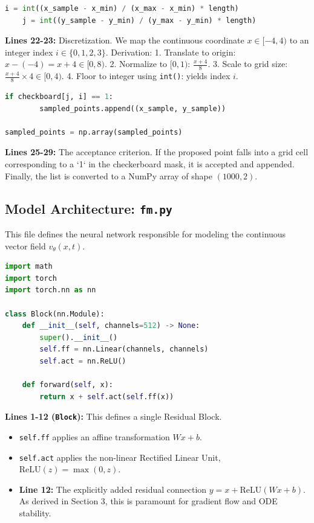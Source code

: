 \documentclass[12pt]{article}
\begin{document}
\begin{lstlisting}[language=Python]
    i = int((x_sample - x_min) / (x_max - x_min) * length)
    j = int((y_sample - y_min) / (y_max - y_min) * length)
\end{lstlisting}
\textbf{Lines 22-23:} Discretization. We map the continuous coordinate $x \in [-4, 4)$ to an integer index $i \in \{0, 1, 2, 3\}$.
Derivation: 
1. Translate to origin: $x - (-4) = x + 4 \in [0, 8)$.
2. Normalize to $[0, 1)$: $\frac{x+4}{8}$.
3. Scale to grid size: $\frac{x+4}{8} \times 4 \in [0, 4)$.
4. Floor to integer using \texttt{int()}: yields index $i$.

\begin{lstlisting}[language=Python]
    if checkboard[j, i] == 1:
        sampled_points.append((x_sample, y_sample))

sampled_points = np.array(sampled_points)
\end{lstlisting}
\textbf{Lines 25-29:} The acceptance criterion. If the proposed point falls into a grid cell corresponding to a `1` in the checkerboard mask, it is accepted and appended. Finally, the list is converted to a NumPy array of shape $(1000, 2)$.

\newpage
\subsection{Model Architecture: \texttt{fm.py}}
This file defines the neural network responsible for modeling the continuous vector field $v_\theta(x, t)$.

\begin{lstlisting}[language=Python]
import math
import torch
import torch.nn as nn

class Block(nn.Module):
    def __init__(self, channels=512) -> None:
        super().__init__()
        self.ff = nn.Linear(channels, channels)
        self.act = nn.ReLU()

    def forward(self, x):
        return x + self.act(self.ff(x))
\end{lstlisting}
\textbf{Lines 1-12 (\texttt{Block}):} This defines a single Residual Block. 
\begin{itemize}
    \item \texttt{self.ff} applies an affine transformation $W x + b$.
    \item \texttt{self.act} applies the non-linear Rectified Linear Unit, $\text{ReLU}(z) = \max(0, z)$.
    \item \textbf{Line 12:} The explicitly added residual connection $y = x + \text{ReLU}(W x + b)$. As derived in Section 3, this is paramount for gradient flow and ODE stability.
\end{itemize}
\end{document}
